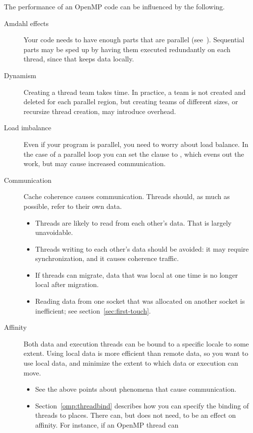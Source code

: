 The performance of an OpenMP code can be influenced by the following.

\begin{description}
\item[Amdahl effects] Your code needs to have enough parts that are
  parallel (see~). Sequential parts may be sped up
  by having them executed redundantly on each thread, since that keeps
  data locally.
\item[Dynamism] Creating a thread team takes time. In practice, a team
  is not created and deleted for each parallel region, but creating
  teams of different sizes, or recursize thread creation, may
  introduce overhead.
\item[Load imbalance] Even if your program is parallel, you need to
  worry about load balance. In the case of a parallel loop you can set
  the  clause to , which evens out
  the work, but may cause increased communication.
\item[Communication] Cache coherence causes communication. Threads
  should, as much as possible, refer to their own data.
  \begin{itemize}
  \item Threads are likely to read from each other's data. That is
    largely unavoidable.
  \item Threads writing to each other's data should be avoided: it may
    require synchronization, and it causes coherence traffic.
  \item If threads can migrate, data that was local at one time is no
    longer local after migration.
  \item Reading data from one socket that was allocated on another
    socket is inefficient; see section~\ref{sec:first-touch}.
  \end{itemize}
\item[Affinity] Both data and execution threads can be bound to a
  specific locale to some extent. Using local data is more efficient
  than remote data, so you want to use local data, and minimize the extent to which data
  or execution can move.
  \begin{itemize}
  \item See the above points about phenomena that cause communication.
  \item Section~\ref{omp:threadbind} describes how you can specify the
    binding of threads to places. There can, but does not need, to be
    an effect on affinity. For instance, if an OpenMP thread can

\end{itemize}
\end{description}

